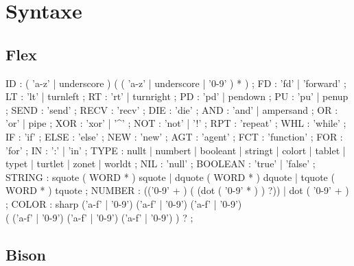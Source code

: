 \section{Syntaxe}

\subsection{Flex}
\label{flex-rail}
\begin{rail}
	ID : ( 'a-z' | underscore ) ( ( 'a-z'  | underscore | '0-9' ) * ) ;
	FD : 'fd' | 'forward'	;
	LT : 'lt' | turnleft	;
	RT : 'rt' | turnright ;
	PD : 'pd' | pendown ;
	PU : 'pu' | penup ;
	SEND : 'send'	;
	RECV : 'recv'	;
	DIE : 'die'	;
	AND : 'and' | ampersand ;
	OR : 'or' | pipe ;
	XOR : 'xor' | '\^{}' ;
	NOT : 'not' | '!'	;
	RPT : 'repeat' ;
	WHL : 'while' ;
	IF : 'if' ;
	ELSE : 'else' ;
	NEW : 'new' ;
	AGT : 'agent' ;
	FCT : 'function' ;
	FOR : 'for' ;
	IN : ':' | 'in' ;
	TYPE : nullt
	| numbert
	| booleant
	| stringt
	| colort
	| tablet
	| typet
	| turtlet
	| zonet
	| worldt
	;
	NIL : 'null' ;
	BOOLEAN : 'true' | 'false' ;
	STRING : squote ( WORD * ) squote
	| dquote ( WORD * ) dquote
	| tquote ( WORD * ) tquote
	;
	NUMBER : (('0-9' + ) ( (dot ( '0-9' * ) ) ?))
	| dot ( '0-9' + ) ;
	COLOR : sharp ('a-f' | '0-9') ('a-f' | '0-9') ('a-f' | '0-9') \\
	( ('a-f' | '0-9') ('a-f' | '0-9') ('a-f' | '0-9') ) ? ;
\end{rail}


\subsection{Bison}
\label{bison-rail}

